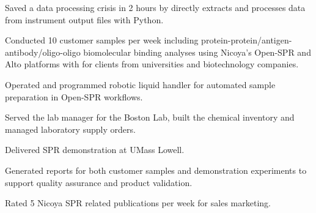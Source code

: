     \item Saved a data processing crisis in 2 hours by directly extracts and processes data from instrument output files with Python.
    \item Conducted 10 customer samples per week including protein-protein/antigen-antibody/oligo-oligo biomolecular binding analyses using Nicoya's Open-SPR and Alto platforms with for clients from universities and biotechnology companies.
    \item Operated and programmed robotic liquid handler for automated sample preparation in Open-SPR workflows. 
    \item Served the lab manager for the Boston Lab, built the chemical inventory and managed laboratory supply orders.
    \item Delivered SPR demonstration at UMass Lowell.
    \item Generated reports for both customer samples and demonstration experiments to support quality assurance and product validation.
    \item Rated 5 Nicoya SPR related publications per week for sales marketing.

